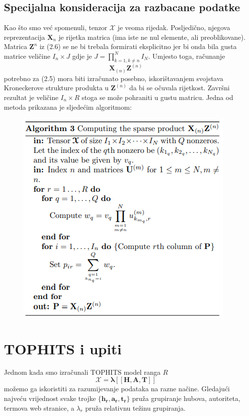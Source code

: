 \documentclass[11pt]{article}
\begin{document}
\subsection{Specijalna konsideracija za razbacane podatke}
Kao što smo već spomenuli, tenzor $\boldsymbol{\mathcal{X}}$ je veoma rijedak. Posljedično, njegova reprezentacija $\boldsymbol{X}_{n}$ je rijetka matrica (ima iste ne nul elemente, ali preoblikovane).
Matrica $\boldsymbol{Z}^{n}$ iz (2.6) se ne bi trebala formirati eksplicitno jer bi onda bila gusta matrice veličine $I_n \times J$ gdje je $J = \prod_{k = 1, k \neq n} ^{N} I_N$.
Umjesto toga, računanje
\begin{equation}
    \boldsymbol{X}_{(n)}\boldsymbol{Z}^{(n)}    
\end{equation}
potrebno za (2.5) mora biti izračunato posebno, iskorištavanjem svojstava Kroneckerove strukture produkta u $\boldsymbol{Z}^{(n)}$ da bi se očuvala rijetkost. Završni rezultat je veličine $I_n \times R$ stoga se može pohraniti u gustu matricu.
Jedna od metoda prikazana je sljedećim algoritmom:

\begin{figure}[hbt!]
    \centering
    \includegraphics{3.alg.png}  
    \label{fig:5}
\end{figure}

\newpage
\section{TOPHITS i upiti}
Jednom kada smo izračunali TOPHITS model ranga $R$
\begin{equation}
   \boldsymbol{\mathcal{X} =  \lambda [\![ H, A, T ]\!]}
\end{equation}
možemo ga iskoristiti za razumijevanje podataka na razne načine.
Gledajući najveću vrijednost svake trojke $\{\boldsymbol{h_r}, \boldsymbol{a_r}, \boldsymbol{t_r}\}$ pruža grupiranje hubova, autoriteta, termova  web stranice, a $\lambda_r$ pruža relativnu težinu grupiranja.
\end{document}
